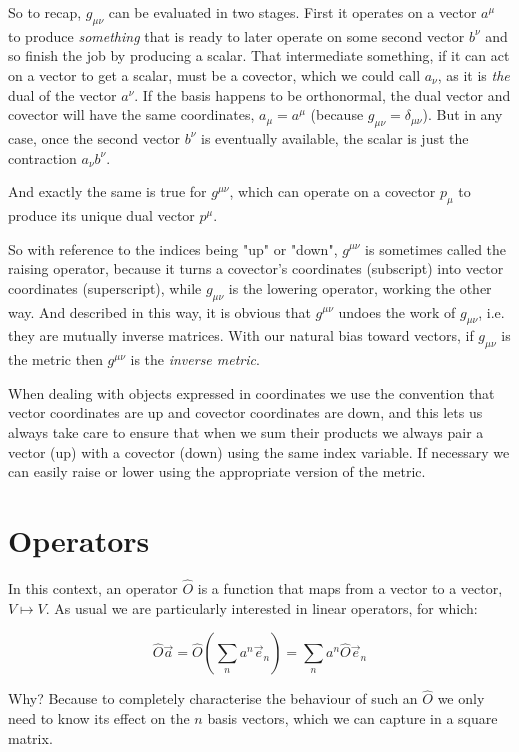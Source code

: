 So to recap, $g_{\mu\nu}$ can be evaluated in two stages. First it operates on a vector $a^{\mu}$ to produce \textit{something} that is ready to later operate on some second vector $b^{\nu}$ and so finish the job by producing a scalar. That intermediate something, if it can act on a vector to get a scalar, must be a covector, which we could call $a_{\nu}$, as it is \textit{the} dual of the vector $a^{\nu}$. If the basis happens to be orthonormal, the dual vector and covector will have the same coordinates, $a_{\mu} = a^{\mu}$ (because $g_{\mu\nu} = \delta_{\mu\nu}$). But in any case, once the second vector $b^{\nu}$ is eventually available, the scalar is just the contraction $a_{\nu} b^{\nu}$.

And exactly the same is true for $g^{\mu\nu}$, which can operate on a covector $p_{\mu}$ to produce its unique dual vector $p^{\mu}$.

So with reference to the indices being "up" or "down", $g^{\mu\nu}$ is sometimes called the raising operator, because it turns a covector's coordinates (subscript) into vector coordinates (superscript), while $g_{\mu\nu}$ is the lowering operator, working the other way. And described in this way, it is obvious that $g^{\mu\nu}$ undoes the work of $g_{\mu\nu}$, i.e. they are mutually inverse matrices. With our natural bias toward vectors, if $g_{\mu\nu}$ is the metric then $g^{\mu\nu}$ is the \textit{inverse metric}.

When dealing with objects expressed in coordinates we use the convention that vector coordinates are up and covector coordinates are down, and this lets us always take care to ensure that when we sum their products we always pair a vector (up) with a covector (down) using the same index variable. If necessary we can easily raise or lower using the appropriate version of the metric.

\section{Operators}

In this context, an operator $\hat{O}$ is a function that maps from a vector to a vector, $V \mapsto V$. As usual we are particularly interested in linear operators, for which:

$$
\hat{O} \vec{a}
=
\hat{O}\left(\sum_n a^n\vec{e}_n \right)
= 
\sum_n a^n\hat{O}\vec{e}_n
$$

Why? Because to completely characterise the behaviour of such an $\hat{O}$ we only need to know its effect on the $n$ basis vectors, which we can capture in a square matrix.

